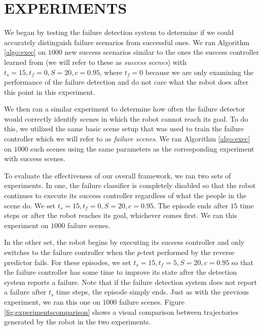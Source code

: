 \documentclass[letterpaper, 10 pt, conference]{ieeeconf}  %
\begin{document}
\section{EXPERIMENTS}\label{sec:experiments}
	We began by testing the failure detection system to determine if we could accurately distinguish failure scenarios from successful ones. We ran Algorithm \ref{algo:exec} on $1000$ new success scenarios similar to the ones the success controller learned from (we will refer to these as \textit{success scenes}) with $t_s=15, t_f=0, S=20, c=0.95$, where $t_f=0$ because we are only examining the performance of the failure detection and do not care what the robot does after this point in this experiment. 
	
	We then ran a similar experiment to determine how often the failure detector would correctly identify scenes in which the robot cannot reach its goal. To do this, we utilized the same basic scene setup that was used to train the failure controller which we will refer to as \textit{failure scenes}. We ran Algorithm \ref{algo:exec} on $1000$ such scenes using the same parameters as the corresponding experiment with success scenes.

	To evaluate the effectiveness of our overall framework, we ran two sets of experiments. In one, the failure classifier is completely disabled so that the robot continues to execute its success controller regardless of what the people in the scene do. We set $t_s=15, t_f=0, S=20, c=0.95$. The episode ends after $15$ time steps or after the robot reaches its goal, whichever comes first. We ran this experiment on $1000$ failure scenes.
	
	In the other set, the robot begins by executing its success controller and only switches to the failure controller when the $p$-test performed by the reverse predictor fails. For these episodes, we set $t_s=15, t_f=5, S=20, c=0.95$ so that the failure controller has some time to improve its state after the detection system reports a failure. Note that if the failure detection system does not report a failure after $t_s$ time steps, the episode simply ends. Just as with the previous experiment, we ran this one on $1000$ failure scenes. Figure \ref{fig:experimentscomparison} shows a visual comparison between trajectories generated by the robot in the two experiments.
	
\end{document}
